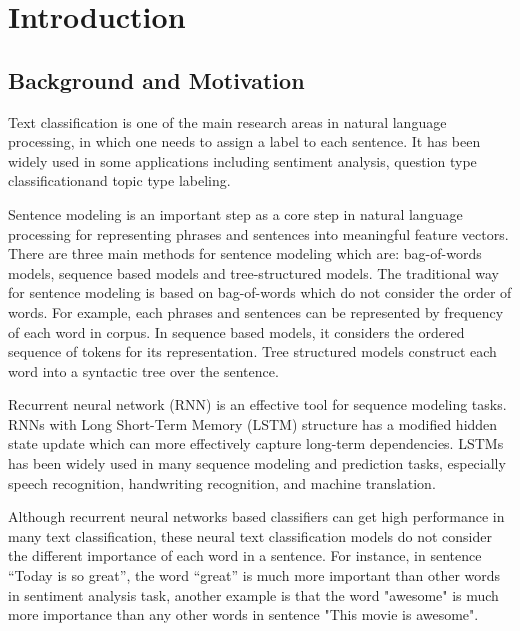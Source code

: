 \documentclass[senior]{IPSstyle}
\begin{document}
 \makepreliminarypages
 \singlespace
 \frontmatter
 \tableofcontents
 \listoffigures
 \listoftables
 \mainmatter
 \clearemptydoublepage
 \setlength{\baselineskip}{23.0pt}

\chapter{Introduction}



\section{Background and Motivation}

Text classification is one of the main research areas in natural language processing, in which one needs to assign a label to each sentence. It has been widely used in some applications including sentiment analysis\cite{maas2011learning}\cite{ghiassi2013twitter}, question type classification\cite{zhang2003question}\cite{li2002learning}and topic type labeling\cite{wang2012baselines}\cite{quercia2012tweetlda}.

Sentence modeling is an important step as a core step in natural language processing for representing phrases and sentences into meaningful feature vectors. There are three main methods for sentence modeling which are: bag-of-words models, sequence based models and tree-structured models. The traditional way for sentence modeling is based on bag-of-words which do not consider the order of words. For example, each phrases and sentences can be represented by frequency of each word in corpus\cite{joachims2002statistical}\cite{joachims1998text}. In sequence based models, it considers the ordered sequence of tokens for its representation\cite{mikolov2010recurrent}\cite{johnson2014effective}. Tree structured models construct each word into a syntactic tree over the sentence\cite{socher2013recursive}.

Recurrent neural network (RNN)\cite{elman1990finding} is an effective tool for sequence modeling tasks. RNNs with Long Short-Term Memory (LSTM) structure\cite{hochreiter1997long} has a modified hidden state update which can more effectively capture long-term dependencies. LSTMs has been widely used in many sequence modeling and prediction tasks, especially speech recognition\cite{li2015constructing}, handwriting recognition\cite{breuel2013high}, and machine translation\cite{sutskever2014sequence}.

Although recurrent neural networks based classifiers can get high performance in many text classification\cite{lee2016sequential}\cite{zhou2015end}, these neural text classification models do not consider the different importance of each word in a sentence. For instance, in sentence “Today is so great”, the word “great” is much more important than other words in sentiment analysis task,  another example is that the word "awesome" is much more importance than any other words in sentence "This movie is awesome".
\end{document}
